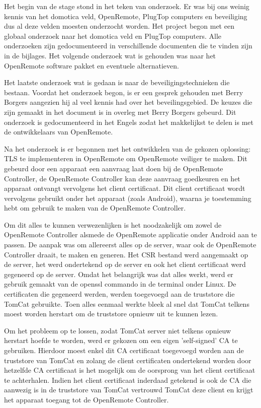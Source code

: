 \documentclass[]{article}
\begin{document}
Het begin van de stage stond in het teken van onderzoek. Er was bij ons
weinig kennis van het domotica veld, OpenRemote, PlugTop computers en
beveiliging dus al deze velden moesten onderzocht worden. Het project begon
met een globaal onderzoek naar het domotica veld en PlugTop computers. Alle
onderzoeken zijn gedocumenteerd in verschillende documenten die te vinden
zijn in de bijlages. Het volgende onderzoek wat is gehouden was naar het
OpenRemote software pakket en eventuele alternatieven.

Het laatste onderzoek wat is gedaan is naar de beveiligingstechnieken die
bestaan. Voordat het onderzoek begon, is er een gesprek gehouden met Berry
Borgers aangezien hij al veel kennis had over het beveilingsgebied. De
keuzes die zijn gemaakt in het document is in overleg met Berry Borgers
gebeurd. Dit onderzoek is gedocumenteerd in het Engels zodat het
makkelijkst te delen is met de ontwikkelaars van OpenRemote.

Na het onderzoek is er begonnen met het ontwikkelen van de gekozen
oplossing: TLS te implementeren in OpenRemote om OpenRemote veiliger te
maken. Dit gebeurd door een apparaat een aanvraag laat doen bij de
OpenRemote Controller, de OpenRemote Controller kan deze aanvraag
goedkeuren en het apparaat ontvangt vervolgens het client certificaat. Dit
client certificaat wordt vervolgens gebruikt onder het apparaat (zoals
Android), waarna je toestemming hebt om gebruik te maken van de OpenRemote
Controller.

Om dit alles te kunnen verwezenlijken is het noodzakelijk om zowel de
OpenRemote Controller alsmede de OpenRemote applicatie onder Android aan te
passen. De aanpak was  om allereerst alles op de server, waar ook de
OpenRemote Controller draait, te maken en generen. Het CSR bestand werd
aangemaakt op de server, het werd ondertekend op de server en ook het
client certificaat werd gegeneerd op de server. Omdat het belangrijk was
dat alles werkt, werd er gebruik gemaakt van de openssl commando in de
terminal onder Linux. De certificaten die gegeneerd werden, werden
toegevoegd aan de truststore die TomCat gebruikte. Toen alles eenmaal
werkte bleek al snel dat TomCat telkens moest worden herstart om de
truststore opnieuw uit te kunnen lezen.

Om het probleem op te lossen, zodat TomCat server niet telkens opnieuw
herstart hoefde te worden, werd er gekozen om een eigen 'self-signed' CA te
gebruiken. Hierdoor moest enkel dit CA certificaat toegevoegd worden aan de
truststore van TomCat en zolang de client certificaten ondertekend worden
door hetzelfde CA certificaat is het mogelijk om de oorsprong van het
client certificaat te achterhalen. Indien het client certificaat inderdaad
getekend is ook de CA die aanwezig is in de truststore van TomCat vertrouwd
TomCat deze client en krijgt het apparaat toegang tot de OpenRemote
Controller.
\end{document}
